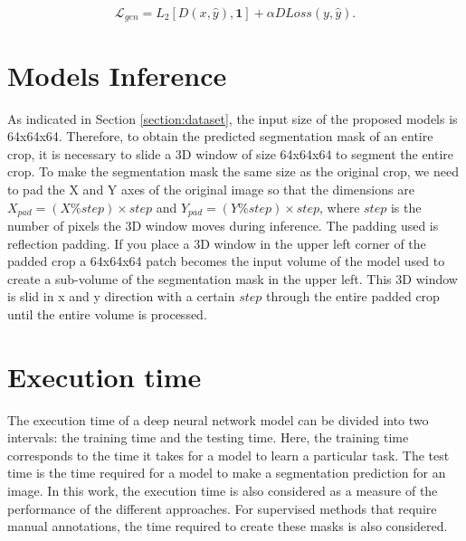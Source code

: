 \begin{equation}
\label{eq:vox2vox-generator-loss}
    \mathcal{L}_{gen} = L_2[D(x,\hat{y}),\boldsymbol{1}] + \alpha DLoss(y,\hat{y}).
\end{equation}

\section{Models Inference}
\label{section:models_inference}

As indicated in Section \ref{section:dataset}, the input size of the proposed models is 64x64x64. Therefore, to obtain the predicted segmentation mask of an entire crop, it is necessary to slide a \ac{3D} window of size 64x64x64 to segment the entire crop. To make the segmentation mask the same size as the original crop, we need to pad the X and Y axes of the original image so that the dimensions are $X_{pad} = (X \% step) \times step $ and $Y_{pad} = (Y \% step) \times step $, where $step$ is the number of pixels the \ac{3D} window moves during inference. The padding used is reflection padding. If you place a \ac{3D} window in the upper left corner of the padded crop a 64x64x64 patch becomes the input volume of the model used to create a sub-volume of the segmentation mask in the upper left. This \ac{3D} window is slid in x and y direction with a certain $step$ through the entire padded crop until the entire volume is processed.



\section{Execution time}
\label{section:execution_time}

The execution time of a deep neural network model can be divided into two intervals: the training time and the testing time. Here, the training time corresponds to the time it takes for a model to learn a particular task. The test time is the time required for a model to make a segmentation prediction for an image. In this work, the execution time is also considered as a measure of the performance of the different approaches. For supervised methods that require manual annotations, the time required to create these masks is also considered.
